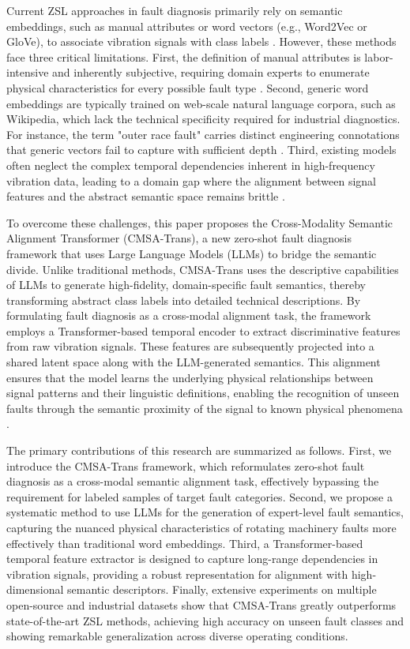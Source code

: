 \documentclass[journal]{IEEEtran}
\begin{document}
Current ZSL approaches in fault diagnosis primarily rely on semantic embeddings, such as manual attributes or word vectors (e.g., Word2Vec or GloVe), to associate vibration signals with class labels \cite{lampert2014attribute}. However, these methods face three critical limitations. First, the definition of manual attributes is labor-intensive and inherently subjective, requiring domain experts to enumerate physical characteristics for every possible fault type \cite{fu2018zero}. Second, generic word embeddings are typically trained on web-scale natural language corpora, such as Wikipedia, which lack the technical specificity required for industrial diagnostics. For instance, the term "outer race fault" carries distinct engineering connotations that generic vectors fail to capture with sufficient depth \cite{mikolov2013efficient}. Third, existing models often neglect the complex temporal dependencies inherent in high-frequency vibration data, leading to a domain gap where the alignment between signal features and the abstract semantic space remains brittle \cite{xian2018zero, buchert2020zero}.

To overcome these challenges, this paper proposes the Cross-Modality Semantic Alignment Transformer (CMSA-Trans), a new zero-shot fault diagnosis framework that uses Large Language Models (LLMs) to bridge the semantic divide. Unlike traditional methods, CMSA-Trans uses the descriptive capabilities of LLMs to generate high-fidelity, domain-specific fault semantics, thereby transforming abstract class labels into detailed technical descriptions. By formulating fault diagnosis as a cross-modal alignment task, the framework employs a Transformer-based temporal encoder to extract discriminative features from raw vibration signals. These features are subsequently projected into a shared latent space along with the LLM-generated semantics. This alignment ensures that the model learns the underlying physical relationships between signal patterns and their linguistic definitions, enabling the recognition of unseen faults through the semantic proximity of the signal to known physical phenomena \cite{vaswani2017attention, radford2021learning}.

The primary contributions of this research are summarized as follows. First, we introduce the CMSA-Trans framework, which reformulates zero-shot fault diagnosis as a cross-modal semantic alignment task, effectively bypassing the requirement for labeled samples of target fault categories. Second, we propose a systematic method to use LLMs for the generation of expert-level fault semantics, capturing the nuanced physical characteristics of rotating machinery faults more effectively than traditional word embeddings. Third, a Transformer-based temporal feature extractor is designed to capture long-range dependencies in vibration signals, providing a robust representation for alignment with high-dimensional semantic descriptors. Finally, extensive experiments on multiple open-source and industrial datasets show that CMSA-Trans greatly outperforms state-of-the-art ZSL methods, achieving high accuracy on unseen fault classes and showing remarkable generalization across diverse operating conditions.
\end{document}
